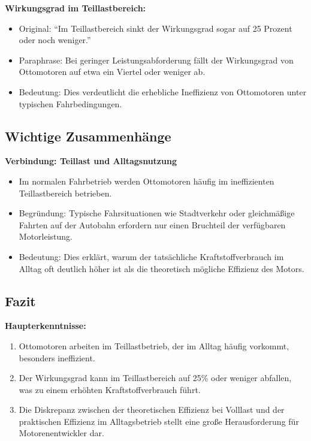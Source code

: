 \documentclass[a4paper,12pt]{article}
\begin{document}
\textbf{Wirkungsgrad im Teillastbereich:}

\begin{itemize}
    \item Original: \enquote{Im Teillastbereich sinkt der Wirkungsgrad sogar auf 25 Prozent oder noch weniger.}
    \item Paraphrase: Bei geringer Leistungsabforderung fällt der Wirkungsgrad von Ottomotoren auf etwa ein Viertel oder weniger ab.
    \item Bedeutung: Dies verdeutlicht die erhebliche Ineffizienz von Ottomotoren unter typischen Fahrbedingungen.
\end{itemize}

\subsection{Wichtige Zusammenhänge}

\textbf{Verbindung: Teillast und Alltagsnutzung}

\begin{itemize}
    \item Im normalen Fahrbetrieb werden Ottomotoren häufig im ineffizienten Teillastbereich betrieben.
    \item Begründung: Typische Fahrsituationen wie Stadtverkehr oder gleichmäßige Fahrten auf der Autobahn erfordern nur einen Bruchteil der verfügbaren Motorleistung.
    \item Bedeutung: Dies erklärt, warum der tatsächliche Kraftstoffverbrauch im Alltag oft deutlich höher ist als die theoretisch mögliche Effizienz des Motors.
\end{itemize}

\subsection{Fazit}

\textbf{Haupterkenntnisse:}

\begin{enumerate}
    \item Ottomotoren arbeiten im Teillastbetrieb, der im Alltag häufig vorkommt, besonders ineffizient.
    \item Der Wirkungsgrad kann im Teillastbereich auf 25\% oder weniger abfallen, was zu einem erhöhten Kraftstoffverbrauch führt.
    \item Die Diskrepanz zwischen der theoretischen Effizienz bei Volllast und der praktischen Effizienz im Alltagsbetrieb stellt eine große Herausforderung für Motorenentwickler dar.
\end{enumerate}
\end{document}
